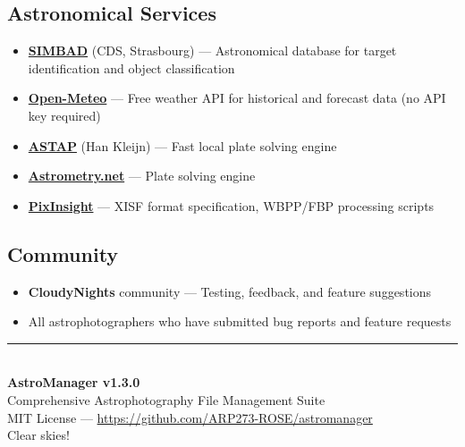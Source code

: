 \documentclass[11pt,a4paper]{article}
\begin{document}
\subsection{Astronomical Services}

\begin{itemize}
    \item \textbf{\href{https://simbad.u-strasbg.fr/}{SIMBAD}} (CDS, Strasbourg) --- Astronomical database for target identification and object classification
    \item \textbf{\href{https://open-meteo.com/}{Open-Meteo}} --- Free weather API for historical and forecast data (no API key required)
    \item \textbf{\href{https://www.hnsky.org/astap.htm}{ASTAP}} (Han Kleijn) --- Fast local plate solving engine
    \item \textbf{\href{https://astrometry.net/}{Astrometry.net}} --- Plate solving engine
    \item \textbf{\href{https://pixinsight.com/}{PixInsight}} --- XISF format specification, WBPP/FBP processing scripts
\end{itemize}

\subsection{Community}

\begin{itemize}
    \item \textbf{CloudyNights} community --- Testing, feedback, and feature suggestions
    \item All astrophotographers who have submitted bug reports and feature requests
\end{itemize}

\vspace{2em}

\begin{center}
\textcolor{mainblue}{\rule{10cm}{0.5pt}}\\[1em]
{\large\textcolor{mainblue}{\textbf{AstroManager v1.3.0}}}\\[0.5em]
{\small\textcolor{mainblue!60}{Comprehensive Astrophotography File Management Suite}}\\[0.5em]
{\small\textcolor{mainblue!40}{MIT License --- \url{https://github.com/ARP273-ROSE/astromanager}}}\\[1em]
{\footnotesize\textcolor{mainblue!30}{Clear skies!}}
\end{center}
\end{document}
